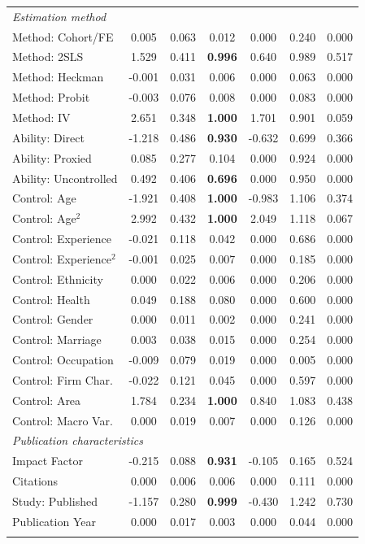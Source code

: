 {\begin{singlespace}
\begin{notsotiny}
\begin{longtable}{
@{\hskip\tabcolsep\extracolsep\fill}
l
*{6}{c}
}
\multicolumn{7}{l}{\emph{Estimation method}}\\
Method: Cohort/FE & 0.005 & 0.063 & 0.012 & 0.000 & 0.240 & 0.000 \\
Method: 2SLS & 1.529 & 0.411 & \textbf{0.996} & 0.640 & 0.989 & 0.517 \\
Method: Heckman & -0.001 & 0.031 & 0.006 & 0.000 & 0.063 & 0.000 \\
Method: Probit & -0.003 & 0.076 & 0.008 & 0.000 & 0.083 & 0.000 \\
Method: IV & 2.651 & 0.348 & \textbf{1.000} & 1.701 & 0.901 & 0.059 \\
Ability: Direct & -1.218 & 0.486 & \textbf{0.930} & -0.632 & 0.699 & 0.366 \\
Ability: Proxied & 0.085 & 0.277 & 0.104 & 0.000 & 0.924 & 0.000 \\
Ability: Uncontrolled & 0.492 & 0.406 & \textbf{0.696} & 0.000 & 0.950 & 0.000 \\
Control: Age & -1.921 & 0.408 & \textbf{1.000} & -0.983 & 1.106 & 0.374 \\
Control: Age$^2$ & 2.992 & 0.432 & \textbf{1.000} & 2.049 & 1.118 & 0.067 \\
Control: Experience & -0.021 & 0.118 & 0.042 & 0.000 & 0.686 & 0.000 \\
Control: Experience$^2$ & -0.001 & 0.025 & 0.007 & 0.000 & 0.185 & 0.000 \\
Control: Ethnicity & 0.000 & 0.022 & 0.006 & 0.000 & 0.206 & 0.000 \\
Control: Health & 0.049 & 0.188 & 0.080 & 0.000 & 0.600 & 0.000 \\
Control: Gender & 0.000 & 0.011 & 0.002 & 0.000 & 0.241 & 0.000 \\
Control: Marriage & 0.003 & 0.038 & 0.015 & 0.000 & 0.254 & 0.000 \\
Control: Occupation & -0.009 & 0.079 & 0.019 & 0.000 & 0.005 & 0.000 \\
Control: Firm Char. & -0.022 & 0.121 & 0.045 & 0.000 & 0.597 & 0.000 \\
Control: Area & 1.784 & 0.234 & \textbf{1.000} & 0.840 & 1.083 & 0.438 \\
Control: Macro Var. & 0.000 & 0.019 & 0.007 & 0.000 & 0.126 & 0.000 \\
\midrule

\multicolumn{7}{l}{\emph{Publication characteristics}}\\
Impact Factor & -0.215 & 0.088 & \textbf{0.931} & -0.105 & 0.165 & 0.524 \\
Citations & 0.000 & 0.006 & 0.006 & 0.000 & 0.111 & 0.000 \\
Study: Published & -1.157 & 0.280 & \textbf{0.999} & -0.430 & 1.242 & 0.730 \\
Publication Year & 0.000 & 0.017 & 0.003 & 0.000 & 0.044 & 0.000 \\
\bottomrule
\addlinespace[0.2em]


\end{longtable}
\end{notsotiny}
\end{singlespace}}
